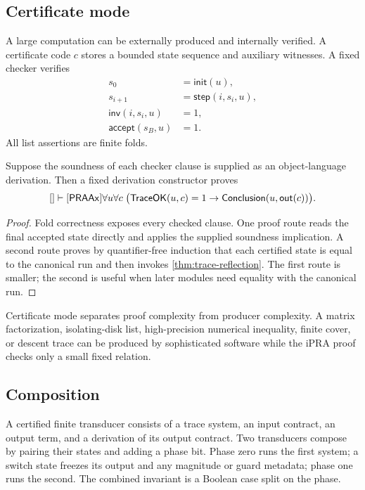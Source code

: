 \subsection{Certificate mode}

A large computation can be externally produced and internally verified.  A
certificate code \(c\) stores a bounded state sequence and auxiliary witnesses.
A fixed checker verifies
\begin{align*}
 s_0&=\mathsf{init}(u),\\
 s_{i+1}&=\mathsf{step}(i,s_i,u),\\
 \mathsf{inv}(i,s_i,u)&=1,\\
 \mathsf{accept}(s_B,u)&=1.
\end{align*}
All list assertions are finite folds.

\begin{theorem}
\label{thm:certificate-reflection}
Suppose the soundness of each checker clause is supplied as an object-language
derivation.  Then a fixed derivation constructor proves
\[
 []\vdash[\mathsf{PRAAx}]\forall u\forall c\;
 \bigl(\mathsf{TraceOK}(u,c)=1\to
       \mathsf{Conclusion}(u,\mathsf{out}(c))\bigr).
\]
\end{theorem}

\begin{proof}
Fold correctness exposes every checked clause.  One proof route reads the final
accepted state directly and applies the supplied soundness implication.  A
second route proves by quantifier-free induction that each certified state is
equal to the canonical run and then invokes \cref{thm:trace-reflection}.  The
first route is smaller; the second is useful when later modules need equality
with the canonical run.
\end{proof}

Certificate mode separates proof complexity from producer complexity.  A
matrix factorization, isolating-disk list, high-precision numerical inequality,
finite cover, or descent trace can be produced by sophisticated software while
the iPRA proof checks only a small fixed relation.

\subsection{Composition}

A certified finite transducer consists of a trace system, an input contract, an
output term, and a derivation of its output contract.  Two transducers compose
by pairing their states and adding a phase bit.  Phase zero runs the first
system; a switch state freezes its output and any magnitude or guard metadata;
phase one runs the second.  The combined invariant is a Boolean case split on
the phase.

